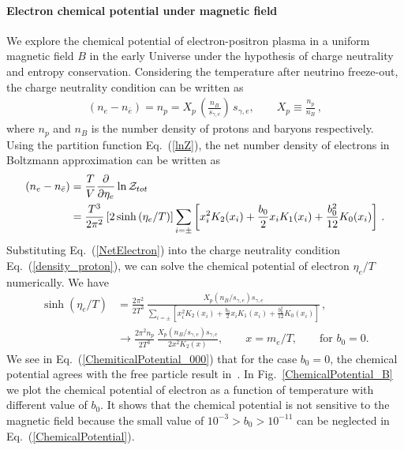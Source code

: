 \paragraph{Electron chemical potential under magnetic field}
We explore the chemical potential of electron-positron plasma in a uniform magnetic field $B$ in the early Universe under the hypothesis of charge neutrality and entropy conservation. Considering the temperature after neutrino freeze-out, the charge neutrality condition can be written as
\begin{align}
 \label{density_proton}
 \left(n_{e}-n_{\bar{e}}\right)=n_{p}=X_p\,\left(\frac{n_{B}}{s_{\gamma,e}}\right)\,s_{\gamma,e},\qquad X_p\equiv\frac{n_p}{n_B}\,,
\end{align}
where $n_{p}$ and $n_B$ is the number density of protons and baryons respectively. Using the partition function Eq.~(\ref{lnZ}), the net number density of electrons in Boltzmann approximation can be written as
\begin{align}\label{NetElectron}
\left(n_e-n_{\bar e}\right)&=\frac{T}{V}\frac{\partial}{\partial \eta_{e}}\ln\mathcal{Z}_{tot}\notag\\
&=\frac{T^3}{2\pi^2}\left[2\sinh{(\eta_{e}/T)}\right]\sum_{i=\pm}\left[x_i^2K_2(x_i)+\frac{b_0}{2}x_i K_1(x_i)+\frac{b^2_0}{12}K_0(x_i)\right]\,.
\end{align}
Substituting Eq.~(\ref{NetElectron}) into the charge neutrality condition Eq.~(\ref{density_proton}), we can solve the chemical potential of electron $\eta_e/T$ numerically. We have
\begin{align}\label{ChemicalPotential}
\sinh{(\eta_{e}/T)}&=\frac{2\pi^2}{2T^3}\,\frac{X_p(n_B/s_{\gamma,e})s_{\gamma,e}}{\sum_{i=\pm}\left[x_i^2K_2(x_i)+\frac{b_0}{2}x_i K_1(x_i)+\frac{b^2_0}{12}K_0(x_i)\right]}\,,\\
&\longrightarrow\frac{2\pi^2n_p}{2T^3}\,\frac{X_p(n_B/s_{\gamma,e})s_{\gamma,e}}{2x^2K_2(x)},\qquad x=m_e/T,\qquad \mathrm{for}\,\,b_0=0\label{ChemiticalPotential_000}.
\end{align}
We see in Eq.~(\ref{ChemiticalPotential_000}) that for the case $b_0=0$, the chemical potential agrees with the free particle result in~\cite{Grayson:2023flr}. In Fig.~\ref{ChemicalPotential_B} we plot the chemical potential of electron as a function of temperature with different value of $b_0$. It shows that the chemical potential is not sensitive to the magnetic field because the small value of $10^{-3}>b_0>10^{-11}$ can be neglected in Eq.~(\ref{ChemicalPotential}).

